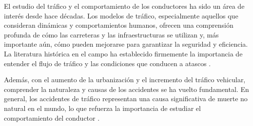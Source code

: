El estudio del tráfico y el comportamiento de los conductores ha sido un área de interés desde hace décadas. Los modelos de tráfico,
especialmente aquellos que consideran dinámicas y comportamientos humanos, ofrecen una comprensión profunda de cómo las carreteras
y las infraestructuras se utilizan y, más importante aún, cómo pueden mejorarse para garantizar la seguridad y eficiencia.
La literatura histórica en el campo ha establecido firmemente la importancia de entender el flujo de tráfico y las condiciones
que conducen a atascos \cite{leutzbach1988, daganzo2002, sugiyama2008}.

Además, con el aumento de la urbanización y el incremento del tráfico vehicular, comprender la naturaleza y causas de los accidentes
se ha vuelto fundamental.
En general, los accidentes de tráfico representan una causa significativa de muerte no natural en el mundo, lo que refuerza la importancia de
estudiar el comportamiento del conductor \cite{lizbetin2017, siuhi2021}.
